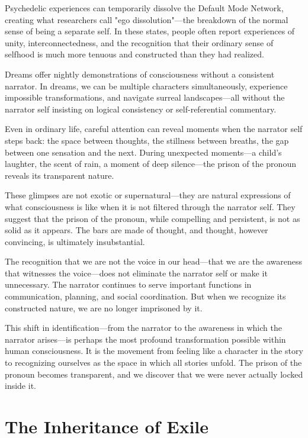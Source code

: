 Psychedelic experiences can temporarily dissolve the Default Mode Network, creating what researchers call "ego dissolution"—the breakdown of the normal sense of being a separate self. In these states, people often report experiences of unity, interconnectedness, and the recognition that their ordinary sense of selfhood is much more tenuous and constructed than they had realized.

Dreams offer nightly demonstrations of consciousness without a consistent narrator. In dreams, we can be multiple characters simultaneously, experience impossible transformations, and navigate surreal landscapes—all without the narrator self insisting on logical consistency or self-referential commentary.

Even in ordinary life, careful attention can reveal moments when the narrator self steps back: the space between thoughts, the stillness between breaths, the gap between one sensation and the next. During unexpected moments—a child's laughter, the scent of rain, a moment of deep silence—the prison of the pronoun reveals its transparent nature.

These glimpses are not exotic or supernatural—they are natural expressions of what consciousness is like when it is not filtered through the narrator self. They suggest that the prison of the pronoun, while compelling and persistent, is not as solid as it appears. The bars are made of thought, and thought, however convincing, is ultimately insubstantial.

The recognition that we are not the voice in our head—that we are the awareness that witnesses the voice—does not eliminate the narrator self or make it unnecessary. The narrator continues to serve important functions in communication, planning, and social coordination. But when we recognize its constructed nature, we are no longer imprisoned by it.

This shift in identification—from the narrator to the awareness in which the narrator arises—is perhaps the most profound transformation possible within human consciousness. It is the movement from feeling like a character in the story to recognizing ourselves as the space in which all stories unfold. The prison of the pronoun becomes transparent, and we discover that we were never actually locked inside it.

\section{The Inheritance of Exile}

